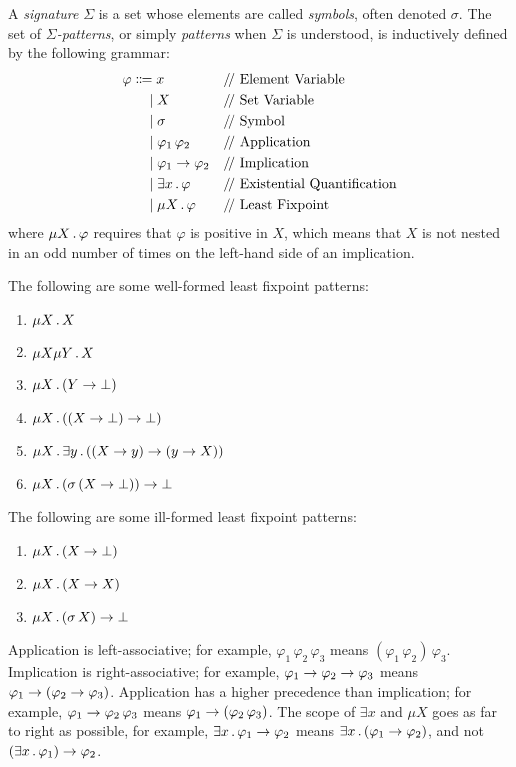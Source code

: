 \documentclass{article}
\begin{document}
\begin{definition}
\label{def:ml_patterns}
A \emph{signature} $\Sigma$ is a set whose elements are called 
\emph{symbols}, often denoted $\sigma$. 
The set of \emph{$\Sigma$-patterns},
or simply \emph{patterns} when $\Sigma$ is understood,
is inductively defined by the following grammar:
\begin{align*}
\varphi 
&\Coloneqq x 
  && \text{\Slash Element Variable} 
\\&\ \ \ \mid X 
  && \text{\Slash Set Variable}
\\&\ \ \ \mid \sigma 
  && \text{\Slash Symbol}
\\&\ \ \ \mid \varphi_1 \, \varphi_2
  && \text{\Slash Application}
\\&\ \ \ \mid \varphi_1 \imp \varphi_2
  && \text{\Slash Implication}
\\&\ \ \ \mid \exists x \ld \varphi
  && \text{\Slash Existential Quantification}
\\&\ \ \ \mid \mu X \ld \varphi
  && \text{\Slash Least Fixpoint}
\end{align*}
where $\mu X \,.\, \varphi$ requires that $\varphi$ is positive in $X$,
which means that $X$ is not nested in an odd number 
of times on the left-hand side of an implication. 
\end{definition}

The following are some well-formed least fixpoint patterns:
\begin{enumerate}
\item $\mu X \,.\, X$
\item $\mu X \mu Y \,.\, X$
\item $\mu X \,.\, (Y \to \bot)$
\item $\mu X \,.\, ((X \to \bot) \to \bot)$
\item $\mu X \,.\, \exists y \,.\, ((X \to y) \to (y \to X))$
\item $\mu X \,.\, (\sigma \, (X \to \bot)) \to \bot$
\end{enumerate}
The following are some ill-formed least fixpoint patterns:
\begin{enumerate}
\item $\mu X \,.\, (X \to \bot)$
\item $\mu X \,.\, (X \to X)$
\item $\mu X \,.\, (\sigma \, X) \to \bot$
\end{enumerate}

Application is left-associative;
for example, $\varphi_1 \, \varphi_2 \, \varphi_3$ means
$(\varphi_1 \, \varphi_2) \, \varphi_3$.
Implication is right-associative;
for example, $\varphi_1 \to \varphi_2 \to \varphi_3$ means
$\varphi_1 \to (\varphi_2 \to \varphi_3)$. 
Application has a higher precedence than implication;
for example, $\varphi_1 \to \varphi_2 \, \varphi_3$ means
$\varphi_1 \to (\varphi_2 \, \varphi_3)$. 
The scope of $\exists x$ and $\mu X$ goes as far to right as possible,
for example, $\exists x \,.\, \varphi_1 \to \varphi_2$ means
$\exists x \,.\, (\varphi_1 \to \varphi_2)$,
and not $(\exists x \,.\, \varphi_1) \to \varphi_2$.
\end{document}
